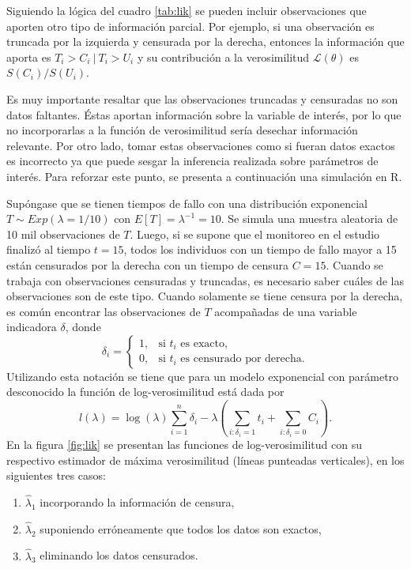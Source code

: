 \documentclass[11pt,a4paper]{article}
\begin{document}
Siguiendo la lógica del cuadro \ref{tab:lik} se pueden incluir observaciones que aporten otro tipo de información parcial. Por ejemplo, si una observación es truncada por la izquierda y censurada por la derecha, entonces la información que aporta es $T_i>C_i \ | \ T_i > U_i$ y su contribución a la verosimilitud $\mathcal{L}(\theta)$ es $S(C_i)/S(U_i)$.

Es muy importante resaltar que las observaciones truncadas y censuradas no son datos faltantes. Éstas aportan información sobre la variable de interés, por lo que no incorporarlas a la función de verosimilitud sería desechar información relevante. Por otro lado, tomar estas observaciones como si fueran datos exactos es incorrecto ya que puede sesgar la inferencia realizada sobre parámetros de interés. Para reforzar este punto, se presenta a continuación una simulación en R.

\newpage

Supóngase que se tienen tiempos de fallo con una distribución exponencial $T \sim Exp(\lambda = 1/10)$ con $E[T] = \lambda^{-1} = 10$. Se simula una muestra aleatoria de 10 mil observaciones de $T$. Luego, si se supone que el monitoreo en el estudio finalizó al tiempo $t = 15$, todos los individuos con un tiempo de fallo mayor a 15 están censurados por la derecha con un tiempo de censura $C = 15$. Cuando se trabaja con observaciones censuradas y truncadas, es necesario saber cuáles de las observaciones son de este tipo. Cuando solamente se tiene censura por la derecha, es común encontrar las observaciones de $T$ acompañadas de una variable indicadora $\delta$, donde $$\delta_i = \begin{cases}
1, & \text{si } t_i \text{ es exacto},\\
0, & \text{si } t_i \text{ es censurado por derecha}.
\end{cases}$$ Utilizando esta notación se tiene que para un modelo exponencial con parámetro desconocido la función de log-verosimilitud está dada por $$l(\lambda) = \log (\lambda) \sum_{i = 1}^n \delta_i - \lambda \left(\sum_{i: \delta_i = 1} t_i + \sum_{i: \delta_i = 0} C_i\right).$$ En la figura \ref{fig:lik} se presentan las funciones de log-verosimilitud con su respectivo estimador de máxima verosimilitud (líneas punteadas verticales), en los siguientes tres casos:
\begin{enumerate}
\item $\hat{\lambda}_1$ incorporando la información de censura,
\item $\hat{\lambda}_2$ suponiendo erróneamente que todos los datos son exactos,
\item $\hat{\lambda}_3$ eliminando los datos censurados.
\end{enumerate}
\end{document}
